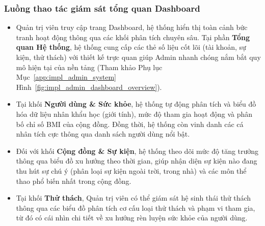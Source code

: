 \subsubsection{Luồng thao tác giám sát tổng quan Dashboard}
\begin{itemize}
    \item Quản trị viên truy cập trang Dashboard, hệ thống hiển thị toàn cảnh bức tranh hoạt động thông qua các khối phân tích chuyên sâu. Tại phần \textbf{Tổng quan Hệ thống}, hệ thống cung cấp các thẻ số liệu cốt lõi (tài khoản, sự kiện, thử thách) với thiết kế trực quan giúp Admin nhanh chóng nắm bắt quy mô hiện tại của nền tảng (Tham khảo Phụ lục Mục~\ref{app:impl_admin_system} Hình~\ref{fig:impl_admin_dashboard_overview}).


    \item Tại khối \textbf{Người dùng \& Sức khỏe}, hệ thống tự động phân tích và biểu đồ hóa dữ liệu nhân khẩu học (giới tính), mức độ tham gia hoạt động và phân bố chỉ số BMI của cộng đồng. Đồng thời, hệ thống còn vinh danh các cá nhân tích cực thông qua danh sách người dùng nổi bật.

    \item Đối với khối \textbf{Cộng đồng \& Sự kiện}, hệ thống theo dõi mức độ tăng trưởng thông qua biểu đồ xu hướng theo thời gian, giúp nhận diện sự kiện nào đang thu hút sự chú ý (phân loại sự kiện ngoài trời, trong nhà) và các môn thể thao phổ biến nhất trong cộng đồng.

    \item Tại khối \textbf{Thử thách}, Quản trị viên có thể giám sát hệ sinh thái thử thách thông qua các biểu đồ phân tích cơ cấu loại thử thách và phạm vi tham gia, từ đó có cái nhìn chi tiết về xu hướng rèn luyện sức khỏe của người dùng.
\end{itemize}

